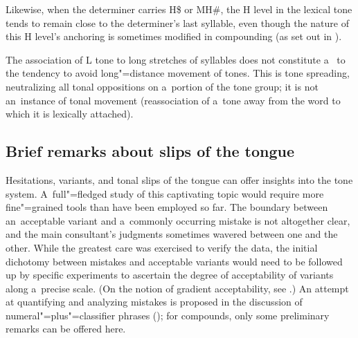 Likewise, when the determiner carries H\$ or MH\#, the H level in the lexical tone tends to remain close to the determiner's last syllable, even though the
nature of this H level's anchoring is sometimes modified in compounding (as set out in ). 

The association of L tone to long stretches of syllables does not
constitute a~ to the tendency to avoid long"=distance
movement of tones. This is tone spreading,
neutralizing all tonal oppositions on a~portion of the tone
group; it is not an~instance of tonal movement (reassociation of a~tone
away from the word to which it is lexically attached). 

\subsection{Brief remarks about slips of the tongue}
\label{sec:slipsofthetongue}

Hesitations, variants, and tonal slips of the tongue can offer insights into the tone system. A~full"=fledged study of this captivating topic would require more fine"=grained tools than
have been employed so far. The {boundary} between an~acceptable variant and a~commonly occurring mistake is
not altogether clear, and the main consultant’s judgments sometimes wavered between one and the
other. While the greatest care was exercised to verify the data, the initial dichotomy between
mistakes and acceptable variants would need to be followed up by specific experiments
to ascertain the degree of acceptability of variants along a~precise scale. (On the notion of
gradient acceptability, see \citealt{kirbyetal2007,coetzee2008constraints,goldrick2011}.) An attempt at quantifying and analyzing mistakes is proposed in the discussion of numeral"=plus"=classifier phrases (); for compounds, only some preliminary remarks can be offered here.

